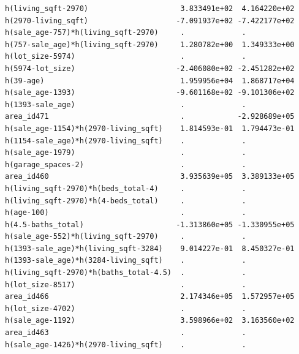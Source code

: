 \documentclass[
]{article}
\begin{document}
\begin{verbatim}
h(living_sqft-2970)                     3.833491e+02  4.164220e+02
h(2970-living_sqft)                    -7.091937e+02 -7.422177e+02
h(sale_age-757)*h(living_sqft-2970)     .             .           
h(757-sale_age)*h(living_sqft-2970)     1.280782e+00  1.349333e+00
h(lot_size-5974)                        .             .           
h(5974-lot_size)                       -2.406080e+02 -2.451282e+02
h(39-age)                               1.959956e+04  1.868717e+04
h(sale_age-1393)                       -9.601168e+02 -9.101306e+02
h(1393-sale_age)                        .             .           
area_id471                              .            -2.928689e+05
h(sale_age-1154)*h(2970-living_sqft)    1.814593e-01  1.794473e-01
h(1154-sale_age)*h(2970-living_sqft)    .             .           
h(sale_age-1979)                        .             .           
h(garage_spaces-2)                      .             .           
area_id460                              3.935639e+05  3.389133e+05
h(living_sqft-2970)*h(beds_total-4)     .             .           
h(living_sqft-2970)*h(4-beds_total)     .             .           
h(age-100)                              .             .           
h(4.5-baths_total)                     -1.313860e+05 -1.330955e+05
h(sale_age-552)*h(living_sqft-2970)     .             .           
h(1393-sale_age)*h(living_sqft-3284)    9.014227e-01  8.450327e-01
h(1393-sale_age)*h(3284-living_sqft)    .             .           
h(living_sqft-2970)*h(baths_total-4.5)  .             .           
h(lot_size-8517)                        .             .           
area_id466                              2.174346e+05  1.572957e+05
h(lot_size-4702)                        .             .           
h(sale_age-1192)                        3.598966e+02  3.163560e+02
area_id463                              .             .           
h(sale_age-1426)*h(2970-living_sqft)    .             .           
                                                                  

\end{verbatim}
\end{document}

